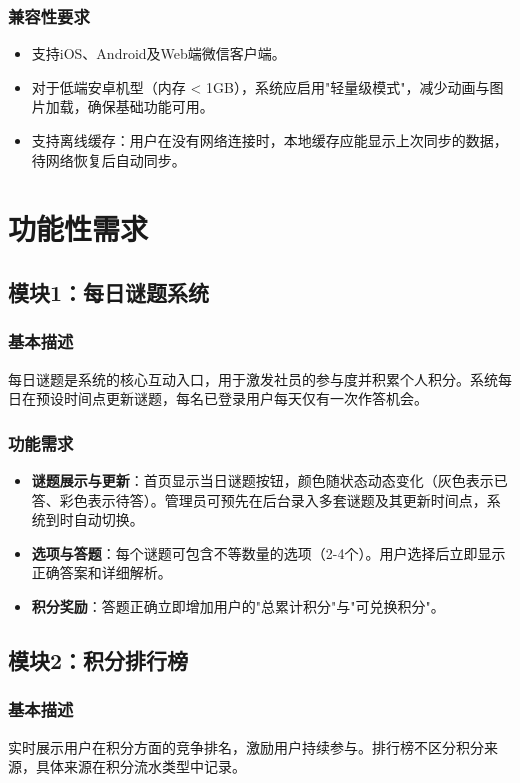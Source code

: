 \documentclass[a4paper,12pt]{article}
\begin{document}
\subsubsection{兼容性要求}
\begin{itemize}
    \item 支持iOS、Android及Web端微信客户端。
    \item 对于低端安卓机型（内存 < 1GB），系统应启用"轻量级模式"，减少动画与图片加载，确保基础功能可用。
    \item 支持离线缓存：用户在没有网络连接时，本地缓存应能显示上次同步的数据，待网络恢复后自动同步。
\end{itemize}

\section{功能性需求}

\subsection{模块1：每日谜题系统}
\subsubsection{基本描述}
每日谜题是系统的核心互动入口，用于激发社员的参与度并积累个人积分。系统每日在预设时间点更新谜题，每名已登录用户每天仅有一次作答机会。

\subsubsection{功能需求}
\begin{itemize}
    \item \textbf{谜题展示与更新}：首页显示当日谜题按钮，颜色随状态动态变化（灰色表示已答、彩色表示待答）。管理员可预先在后台录入多套谜题及其更新时间点，系统到时自动切换。
    \item \textbf{选项与答题}：每个谜题可包含不等数量的选项（2-4个）。用户选择后立即显示正确答案和详细解析。
    \item \textbf{积分奖励}：答题正确立即增加用户的"总累计积分"与"可兑换积分"。
\end{itemize}

\subsection{模块2：积分排行榜}
\subsubsection{基本描述}
实时展示用户在积分方面的竞争排名，激励用户持续参与。排行榜不区分积分来源，具体来源在积分流水类型中记录。
\end{document}
